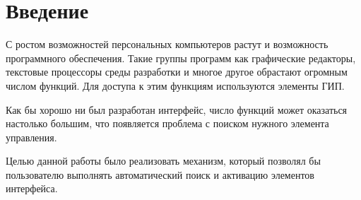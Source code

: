 \chapter*{Введение}

С ростом возможностей персональных компьютеров растут и возможность программного обеспечения. Такие группы программ как графические редакторы, текстовые процессоры среды разработки и многое другое обрастают огромным числом функций. Для доступа к этим функциям используются элементы ГИП.

Как бы хорошо ни был разработан интерфейс, число функций может оказаться настолько большим, что появляется проблема с поиском нужного элемента управления. 

Целью данной работы было реализовать механизм, который позволял бы пользователю выполнять автоматический поиск и активацию элементов интерфейса.